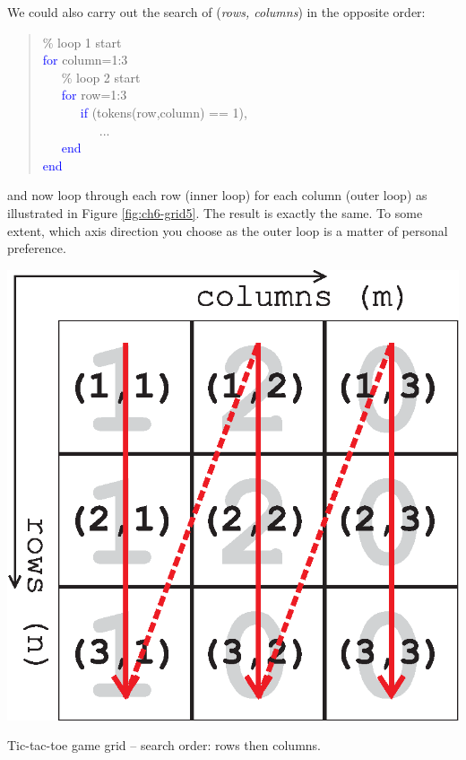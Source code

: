 \documentclass{tufte-book} %
\newenvironment{docspec}{\begin{quotation}\ttfamily\parskip0pt\parindent0pt\ignorespaces}{\end{quotation}}
\begin{document}
We could also carry out the search of (\textit{rows, columns}) in the opposite order:
\begin{docspec}
\textcolor[rgb]{0,0.501961,0}{\% loop 1 start\\}
\textcolor{blue}{for} column=1:3\\
\ \ \ \textcolor[rgb]{0,0.501961,0}{\% loop 2 start\\}
\ \ \ \textcolor{blue}{for} row=1:3\\
\ \ \ \ \ \ \textcolor{blue}{if} (tokens(row,column) == 1),\\
\ \ \ \ \ \ \ \ \ ...\\
\ \ \ \textcolor{blue}{end}\\
\textcolor{blue}{end}
\end{docspec}
and now loop through each row (inner loop) for each column (outer loop) as illustrated in Figure \ref{fig:ch6-grid5}. The result is exactly the same. To some extent, which axis direction you choose as the outer loop is a matter of personal preference.

\begin{marginfigure}[0.0in]
\includegraphics[width=\linewidth]{ch6-grid5.eps}
\caption{Tic-tac-toe game grid -- search order: rows then columns.}
\label{fig:ch6-grid5}
\end{marginfigure}
\end{document}
